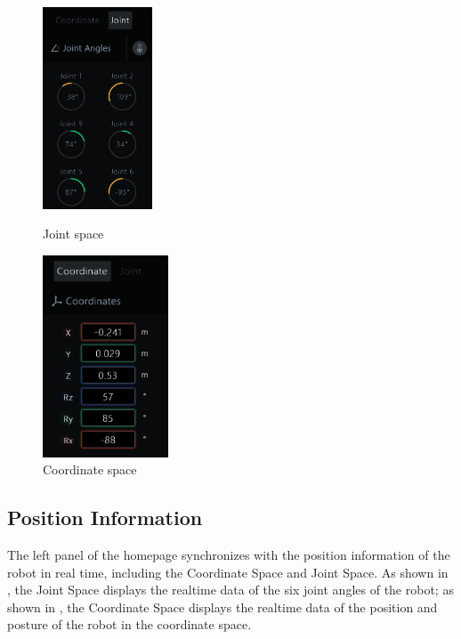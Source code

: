 

\begin{figure}[ht]
	\centering
	\begin{minipage}[t]{0.45\linewidth}
		\centering
		\includegraphics[height=6cm]{en/image/2-12-1.png}
		\caption{Joint space}
		\label{fig:关节位置信息}
	\end{minipage}
	\begin{minipage}[t]{0.45\linewidth}
		\centering
		\includegraphics[height=6cm]{en/image/2-12.png}
		\caption{Coordinate space}
		\label{fig:坐标位置信息}
	\end{minipage}
\end{figure}


\subsection{Position Information}
\LM The left panel of the \LM homepage synchronizes with the position information of the robot in real time, including the Coordinate Space and Joint Space. As shown in , the Joint Space displays the real­time data of the six joint angles of the robot; as shown in , the Coordinate Space displays the real­time data of the position and posture of the robot in the coordinate space.

